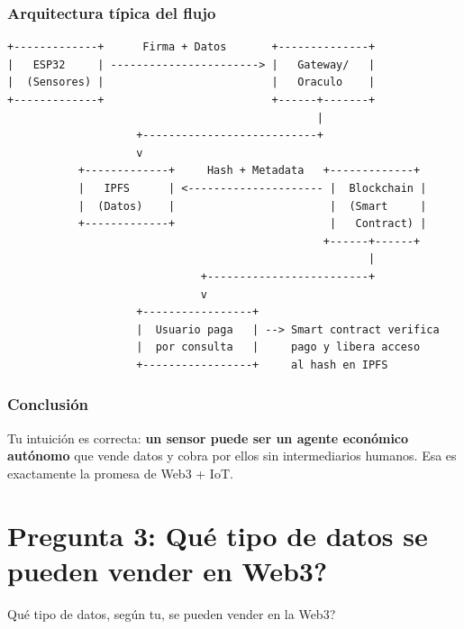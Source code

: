 \documentclass[12pt,a4paper]{article}
\begin{document}
\subsubsection{Arquitectura t\'{i}pica del flujo}

\begin{verbatim}
+-------------+      Firma + Datos       +--------------+
|   ESP32     | -----------------------> |   Gateway/   |
|  (Sensores) |                          |   Oraculo    |
+-------------+                          +------+-------+
                                                |
                    +---------------------------+
                    v
           +-------------+     Hash + Metadata   +-------------+
           |   IPFS      | <--------------------- |  Blockchain |
           |  (Datos)    |                        |  (Smart     |
           +-------------+                        |   Contract) |
                                                 +------+------+
                                                        |
                              +-------------------------+
                              v
                    +-----------------+
                    |  Usuario paga   | --> Smart contract verifica
                    |  por consulta   |     pago y libera acceso
                    +-----------------+     al hash en IPFS
\end{verbatim}

\subsubsection{Conclusi\'{o}n}
Tu intuici\'{o}n es correcta: \textbf{un sensor puede ser un agente econ\'{o}mico aut\'{o}nomo} que vende datos y cobra por ellos sin intermediarios humanos. Esa es exactamente la promesa de Web3 + IoT.


\section{Pregunta 3: \textquestiondown Qu\'{e} tipo de datos se pueden vender en Web3?}

\begin{tcolorbox}[colback=orange!5!white,colframe=orange!75!black,title={\textbf{Pregunta del Profesor CERO}}]
\textquestiondown Qu\'{e} tipo de datos, seg\'{u}n tu, se pueden vender en la Web3?
\end{tcolorbox}
\end{document}
